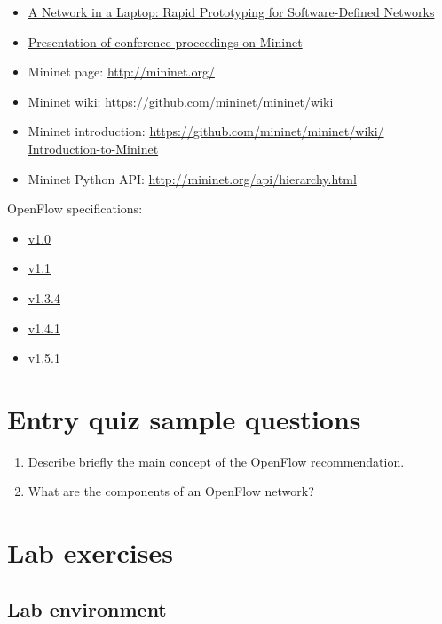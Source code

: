 \documentclass[a4paper]{article}
\begin{document}
\begin{itemize}
    \item \href{https://qosip.tmit.bme.hu/foswiki/pub/Meres/OpenFlowMScMeresiSegedlet/a19-lantz.pdf}{A Network in a
              Laptop: Rapid Prototyping for Software-Defined Networks}
    \item

          \href{https://qosip.tmit.bme.hu/foswiki/pub/Meres/OpenFlowMScMeresiSegedlet/mininet-hotnets2010-final.pdf}{Presentation
              of conference proceedings on Mininet}
    \item	Mininet page: \url{http://mininet.org/}
    \item	Mininet wiki: \url{https://github.com/mininet/mininet/wiki}
    \item	Mininet introduction: \url{https://github.com/mininet/mininet/wiki/  Introduction-to-Mininet}
    \item	Mininet Python API: \url{http://mininet.org/api/hierarchy.html}
\end{itemize}

OpenFlow specifications:
\begin{itemize}
    \item
          \href{https://qosip.tmit.bme.hu/foswiki/pub/Meres/OpenFlowMScMeresiSegedlet/openflow-spec-v1.0.0.pdf}{v1.0}
    \item
          \href{https://qosip.tmit.bme.hu/foswiki/pub/Meres/OpenFlowMScMeresiSegedlet/openflow-spec-v1.1.0.pdf}{v1.1}
    \item

          \href{https://qosip.tmit.bme.hu/foswiki/pub/Meres/OpenFlowMScMeresiSegedlet/openflow-switch-v1.3.4.pdf}{v1.3.4}
    \item

          \href{https://qosip.tmit.bme.hu/foswiki/pub/Meres/OpenFlowMScMeresiSegedlet/openflow-switch-v1.4.1.pdf}{v1.4.1}
    \item

          \href{https://qosip.tmit.bme.hu/foswiki/pub/Meres/OpenFlowMScMeresiSegedlet/openflow-switch-v1.5.1.pdf}{v1.5.1}

\end{itemize}

\appendix

\section{Entry quiz sample questions}

\begin{enumerate}
    \item Describe briefly the main concept of the OpenFlow recommendation.
    \item What are the components of an OpenFlow network?
\end{enumerate}

\section{Lab exercises}

\subsection{Lab environment}
\end{document}
